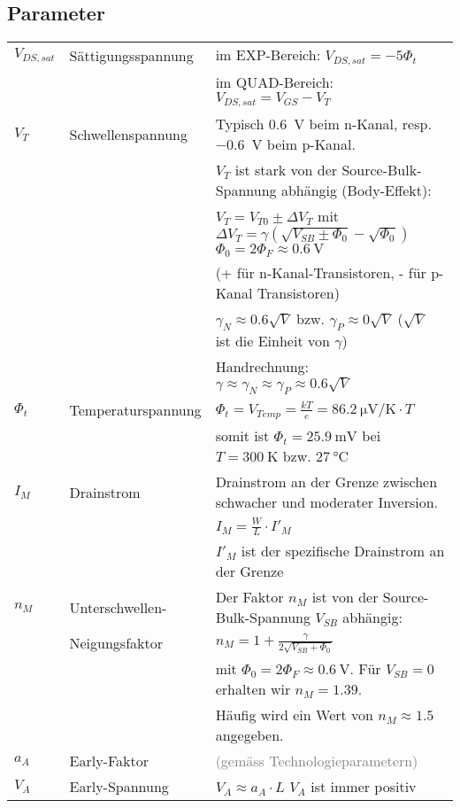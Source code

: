 \subsection{Parameter}
\begin{tabular}{|p{}|p{}|p{}|}
	\hline
	$V_{DS,sat}$&Sättigungsspannung&im EXP-Bereich:   $V_{DS,sat} = -5\Phi_t$ \\ 
	&&im QUAD-Bereich:	$V_{DS,sat} = V_{GS}-V_T$\\ \hline
	$V_T$&Schwellenspannung&Typisch \SI{0.6}{\volt} beim n-Kanal, resp. \SI{-0.6}{\volt} beim p-Kanal.\\
	&& $V_T$ ist stark von der Source-Bulk-Spannung abhängig (Body-Effekt):\\
	&&$V_T = V_{T0}\pm \Delta V_T$ mit $\Delta V_T = \gamma \left( \sqrt{V_{SB} \pm \Phi_0} - \sqrt{\Phi_0}\right)$ \qquad $\Phi_0 = 2\Phi_F \approx \SI{0.6}{\volt}$\\
	&&(+ für n-Kanal-Transistoren, - für p-Kanal Transistoren)\\
	&& $\gamma_N \approx 0.6 \sqrt{V}$ bzw. $\gamma_P \approx 0 \sqrt{V}$ ($\sqrt{V}$ ist die Einheit von $\gamma$)\\
	&&Handrechnung: $\gamma \approx \gamma_N \approx \gamma_P \approx 0.6\sqrt{V}$\\ \hline
	$\Phi_t$&Temperaturspannung&$\Phi_t = V_{Temp} = \frac{kT}{e} = \SI{86.2}{\micro\volt / \kelvin} \cdot T$\\
	&&somit ist $\Phi_t = \SI{25.9}{\milli\volt}$ bei $T=\SI{300}{\kelvin}$ bzw. $\SI{27}{\degreeCelsius}$\\ \hline
	$I_M$&Drainstrom&Drainstrom an der Grenze zwischen schwacher und moderater Inversion.\\
	&&$I_M=\frac{W}{L}\cdot I'_M$\\
	&&$I'_M$ ist der spezifische Drainstrom an der Grenze\\ \hline
	$n_M$&Unterschwellen-&Der Faktor $n_M$ ist von der Source-Bulk-Spannung $V_{SB}$ abhängig:\\
	&Neigungsfaktor&$n_M=1+\frac{\gamma}{2\sqrt{V_{SB}+\Phi_0}}$\\
	&&mit $\Phi_0 = 2\Phi_F \approx \SI{0.6}{\volt}$. Für $V_{SB} = 0$ erhalten wir $n_M = 1.39$.\\
	&&Häufig wird ein Wert von $n_M \approx 1.5$ angegeben.\\ \hline
	$a_A$&Early-Faktor&\textcolor{gray}{(gemäss Technologieparametern)}\\ \hline
	$V_A$&Early-Spannung&$V_A \approx a_A \cdot L$ \hspace{0.5cm} $V_A$ ist immer positiv\\ \hline

\end{tabular}
